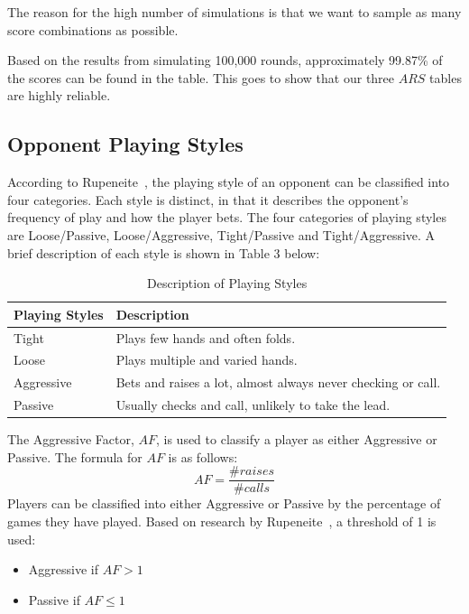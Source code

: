\documentclass{article}
\begin{document}
\noindent The reason for the high number of simulations is that we want to sample as many score combinations as possible.

Based on the results from simulating 100,000 rounds, approximately 99.87\% of the scores can be found in the table. This goes to show that our three $ARS$ tables are highly reliable.

\subsection{Opponent Playing Styles}

According to Rupeneite~, the playing style of an opponent can be classified into four categories. Each style is distinct, in that it describes the opponent's frequency of play and how the player bets. The four categories of playing styles are Loose/Passive, Loose/Aggressive, Tight/Passive and Tight/Aggressive. A brief description of each style is shown in Table 3 below:

\begin{table}[h!]
  \begin{center}
    \begin{tabular}{|l|p{5cm}|}
    \hline
      \textbf{Playing Styles} & \textbf{Description} \\
      \hline
      Tight & Plays few hands and often folds. \\
      \hline
      Loose & Plays multiple and varied hands.  \\
      \hline
      Aggressive &  Bets and raises a lot, almost always never checking or call. \\
      \hline
      Passive & Usually checks and call, unlikely to take the lead. \\
      \hline
    \end{tabular}
    \caption{Description of Playing Styles}
    \label{tab:table3}
  \end{center}
\end{table}
The Aggressive Factor, $AF$, is used to classify a player as either Aggressive or Passive. The formula for $AF$ is as follows:
\begin{displaymath}
  AF = \frac{\text{\# }raises}{\text{\# }calls}
\end{displaymath}
\noindent Players can be classified into either Aggressive or Passive by the percentage of games they have played. Based on research by Rupeneite~, a threshold of 1 is used:
\begin{itemize}
	\item Aggressive if $AF > 1$
	\item Passive if $AF \leq 1$
\end{itemize}
\end{document}
